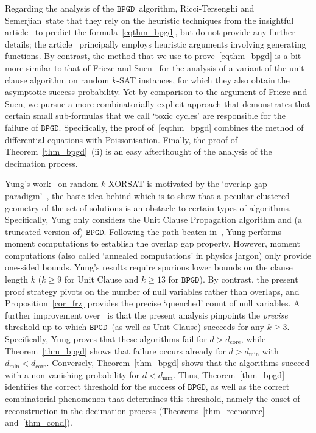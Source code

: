 \documentclass[10pt,reqno]{amsart}
\numberwithin{equation}{section}
\newcommand{\RTS}{Ricci-Tersenghi and Semerjian}
\newcommand\dmin{d_{\mathrm{min}}}
\newcommand\dcore{d_{\mathrm{core}}}
\newcommand{\BPGD}{\ensuremath{\mathtt{BPGD}}}
\newcommand\Prop{Proposition}
\newcommand\Thm{Theorem}
\begin{document}
Regarding the analysis of the \BPGD\ algorithm, \RTS\ state that they rely on the heuristic techniques from the insightful article~\cite{DeroulersMonasson} to predict the formula~\eqref{eqthm_bpgd}, but do not provide any further details; the article~\cite{DeroulersMonasson} principally employs heuristic arguments involving generating functions.
By contrast, the method that we use to prove~\eqref{eqthm_bpgd} is a bit more similar to that of Frieze and Suen~\cite{FriezeSuen} for the analysis of a variant of the unit clause algorithm on random $k$-SAT instances, for which they also obtain the asymptotic success probability.
Yet by comparison to the argument of Frieze and Suen, we pursue a more combinatorially explicit approach that demonstrates that certain small sub-formulas that we call `toxic cycles' are responsible for the failure of \BPGD.
Specifically, the proof of~\eqref{eqthm_bpgd} combines the method of differential equations with Poissonisation.
Finally, the proof of \Thm~\ref{thm_bpgd}~(ii) is an easy afterthought of the analysis of the decimation process.

Yung's work~\cite{Yung} on random $k$-XORSAT is motivated by the `overlap gap paradigm'~\cite{Gamarnik}, the basic idea behind which is to show that a peculiar clustered geometry of the set of solutions is an obstacle to certain types of algorithms.
Specifically, Yung only considers the Unit Clause Propagation algorithm and (a truncated version of) \BPGD.
Following the path beaten in~\cite{Mora}, Yung performs moment computations to establish the overlap gap property.
However, moment computations (also called `annealed computations' in physics jargon) only provide one-sided bounds.
Yung's results require spurious lower bounds on the clause length $k$ ($k\geq9$ for Unit Clause and $k\geq13$ for \BPGD).
By contrast, the present proof strategy pivots on the number of null variables rather than overlaps, and \Prop~\ref{cor_frz} provides the precise `quenched' count of null variables. 
A further improvement over~\cite{Yung} is that the present analysis pinpoints the {\em precise} threshold up to which \BPGD\ (as well as Unit Clause) succeeds for any $k\geq3$.
Specifically, Yung proves that these algorithms fail for $d>\dcore$, while \Thm~\ref{thm_bpgd} shows that failure occurs already for $d>\dmin$ with $\dmin<\dcore$.
Conversely, \Thm~\ref{thm_bpgd} shows that the algorithms succeed with a non-vanishing probability for $d<\dmin$. 
Thus, \Thm~\ref{thm_bpgd} identifies the correct threshold for the success of \BPGD, as well as the correct combinatorial phenomenon that determines this threshold, namely the onset of reconstruction in the decimation process (\Thm s~\ref{thm_recnonrec} and~\ref{thm_cond}).
\end{document}
